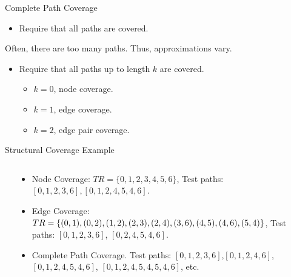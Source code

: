 \documentclass[handout]{beamer}
\begin{document}
\begin{frame}{Complete Path Coverage}
  \begin{itemize}
  \item Require that all paths are covered.
  \end{itemize}
  Often, there are too many paths. Thus, approximations vary.
  \begin{itemize}
  \item Require that all paths up to length $k$ are covered.
    \begin{itemize}
    \item $k=0$, node coverage.
    \item $k=1$, edge coverage.
    \item $k=2$, edge pair coverage.
    \end{itemize}
  \end{itemize}
\end{frame}

 \begin{frame}{Structural Coverage Example}
  \begin{columns}
    \begin{column}{0.2\textwidth}
    \end{column}
    \begin{column}{0.8\textwidth}
      \begin{itemize}
      \item Node Coverage: $TR=\{0,1,2,3,4,5,6\}$, Test paths:
        $[0,1,2,3,6],[0,1,2,4,5,4,6]$.
      \item Edge Coverage:
        $TR=\{(0,1),(0,2),(1,2),(2,3),(2,4),(3,6),(4,5),(4,6), \newline (5,4)\}$,
        Test paths: $[0,1,2,3,6]$, $[0,2,4,5,4,6]$.
      \item Complete Path Coverage. Test paths:
        $[0,1,2,3,6]$,$[0,1,2,4,6]$,$[0,1,2,4,5,4,6]$, $[0,1,2,4,5,4,5,4,6]$, etc.
      \end{itemize}
    \end{column}
  \end{columns}
\end{frame}
\end{document}
